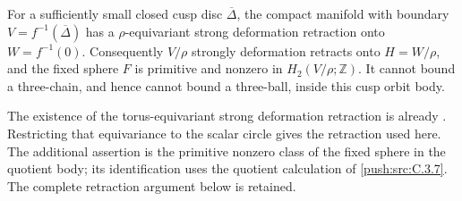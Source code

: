 \begin{lemma}\label{push:src:C.3.8}
For a sufficiently small closed cusp disc \(\overline\Delta\),
the compact manifold with boundary
\(V=f^{-1}(\overline\Delta)\) has a \(\rho\)-equivariant strong
deformation retraction onto \(W=f^{-1}(0)\). Consequently
\(V/\rho\) strongly deformation retracts onto \(H=W/\rho\),
and the fixed sphere \(F\) is primitive and nonzero in
\(H_2(V/\rho;\mathbb Z)\). It cannot bound a three-chain,
and hence cannot bound a three-ball, inside this cusp orbit body.
\end{lemma}

The existence of the torus-equivariant strong deformation retraction is already \citet[Proposition~7.2, p.~41; proof completed on p.~50]{AC26}. Restricting that equivariance to the scalar circle gives the retraction used here. The additional assertion is the primitive nonzero class of the fixed sphere in the quotient body; its identification uses the quotient calculation of \cref{push:src:C.3.7}. The complete retraction argument below is retained.

